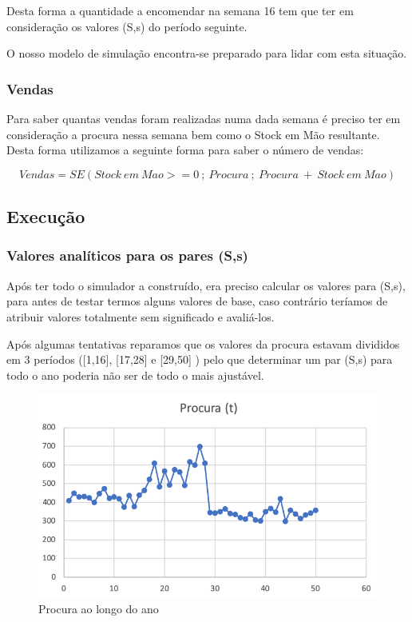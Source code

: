\documentclass[a4paper]{article}
\begin{document}
Desta forma a quantidade a encomendar na semana 16 tem que ter em consideração os valores (S,s) do período seguinte.

O nosso modelo de simulação encontra-se preparado para lidar com esta situação.


\subsubsection{Vendas}

Para saber quantas vendas foram realizadas numa dada semana é preciso ter em consideração a procura nessa semana bem como o Stock em Mão resultante. Desta forma utilizamos a seguinte forma para saber o número de vendas:

 $$ Vendas = SE(Stock\ em\ Mao >= 0\ ;\ Procura\ ;\ Procura\ +\ Stock\ em\ Mao) $$


\subsection{Execução}


\subsubsection{Valores analíticos para os pares (S,s)}

Após ter todo o simulador a construído, era preciso calcular os valores para (S,s), para antes de testar termos alguns valores de base, caso contrário teríamos de atribuir valores totalmente sem significado e avaliá-los.

Após algumas tentativas reparamos que os valores da procura estavam divididos em 3 períodos ([1,16], [17,28] e [29,50] ) pelo que determinar um par (S,s) para todo o ano poderia não ser de todo o mais ajustável.

\begin{figure}[H]
\centering
\includegraphics[scale=0.7]{grafico_procura.png}
\caption{Procura ao longo do ano}
\label{img:grafico_procura}
\end{figure}
\end{document}
